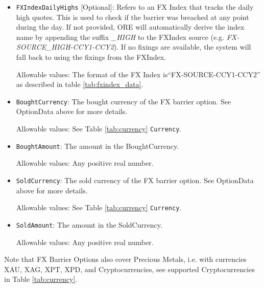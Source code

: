 \begin{itemize}
\item \lstinline!FXIndexDailyHighs! [Optional]: Refers to an FX Index that tracks the daily high quotes. This is used to check if the barrier was breached at any point during the day. If not provided, ORE will automatically derive the index name by appending the suffix \emph{\_HIGH} to the FXIndex source (e.g. \emph{FX-SOURCE\_HIGH-CCY1-CCY2}). If no fixings are available, the system will fall back to using the fixings from the FXIndex.

Allowable values:  The format of the FX Index is``FX-SOURCE-CCY1-CCY2'' as described in table \ref{tab:fxindex_data}.  

\item \lstinline!BoughtCurrency!: The bought currency of the FX barrier option. See OptionData above for more details.

Allowable values:  See Table \ref{tab:currency} \lstinline!Currency!.

\item \lstinline!BoughtAmount!: The amount in the BoughtCurrency.  

Allowable values:  Any positive real number.

\item \lstinline!SoldCurrency!: The sold currency of the FX barrier option. See OptionData above for more details.

Allowable values:  See Table \ref{tab:currency} \lstinline!Currency!.

\item \lstinline!SoldAmount!: The amount in the SoldCurrency.  

Allowable values:  Any positive real number.

\end{itemize}

Note that FX Barrier Options also cover Precious Metals, i.e. with
currencies XAU, XAG, XPT, XPD, and Cryptocurrencies,  see supported Cryptocurrencies in Table \ref{tab:currency}.
